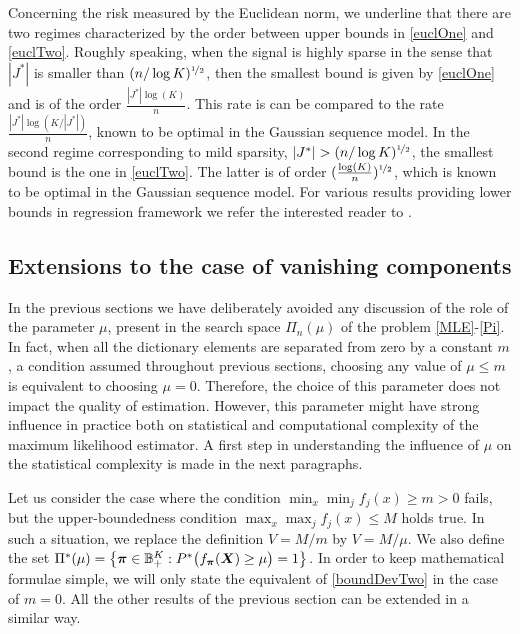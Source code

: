 Concerning the risk measured by the Euclidean norm, we underline that there are two regimes
characterized by the order between upper bounds in \eqref{euclOne} and \eqref{euclTwo}.
Roughly speaking, when the signal is highly sparse in the sense that $|J^*|$ is
smaller than $(n/\log K)^{\nicefrac12}$, then the smallest bound is given by \eqref{euclOne} and
is of the order $\frac{|J^*|\log(K)}{n}$. This rate is can be compared to the
rate $\frac{|J^*|\log(K/|J^*|)}{n}$, known to be optimal in the Gaussian sequence model.
In the second regime corresponding to mild sparsity, $|J^*| > (n/\log K)^{\nicefrac12}$,
the smallest bound is the one in \eqref{euclTwo}. The latter is of order
$(\frac{\log(K)}{n})^{\nicefrac12}$, which is known to be optimal in the Gaussian sequence
model. For various results providing lower bounds in regression framework we refer
the interested reader to \citep{Rask11,RT11,Wang14}.

\subsection{Extensions to the case of vanishing components}
\label{ssec:vanish}

In the previous sections we have deliberately avoided any discussion of the role of the
parameter $\mu$, present in the search space $\Pi_n(\mu)$ of the problem \eqref{MLE}-\eqref{Pi}.
In fact, when all the dictionary elements are separated from zero by  a constant $m$, a
condition assumed throughout previous sections, choosing any value of $\mu\le m$ is equivalent
to choosing $\mu=0$. Therefore, the choice of this parameter does not impact the quality of
estimation. However, this parameter might have strong influence in practice both on statistical
and computational complexity of the maximum likelihood estimator. A first step in understanding
the influence of $\mu$ on the statistical complexity is made in the next paragraphs.

Let us consider the case where the condition $\min_x \min_j f_j(x)\ge m>0$ fails,
but the upper-boundedness condition $\max_x\max_j f_j(x)\le M$ holds true. In such a
situation, we replace the definition $V= M/m$ by $V=M/\mu$. We also define the set
$\Pi^*(\mu) = \big\{\boldsymbol \pi\in{\mathbb B}^K_+ : P^*\big(f_{\boldsymbol \pi}(\boldsymbol X)\ge \mu\big)=1\big\}$.
In order to keep mathematical formulae simple, we will only state the equivalent of
\eqref{boundDevTwo} in the case of $m=0$. All the other results of the previous
section can be extended in a similar way.

